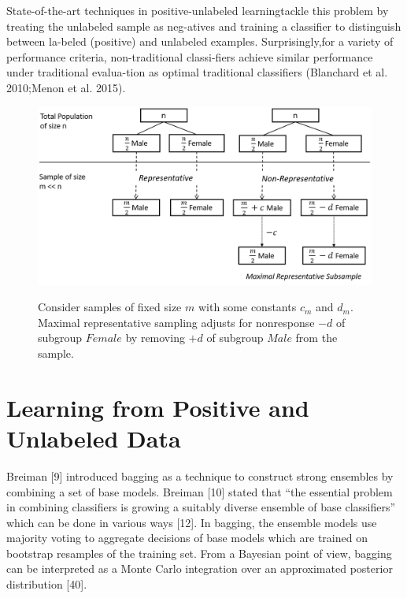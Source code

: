 State-of-the-art techniques in positive-unlabeled learningtackle this problem by treating the unlabeled sample as neg-atives and training a classiﬁer to distinguish between la-beled (positive) and unlabeled examples. 
Surprisingly,for a variety of performance criteria, non-traditional classi-ﬁers achieve similar performance under traditional evalua-tion as optimal traditional classiﬁers (Blanchard et al. 2010;Menon et al. 2015). 

\begin{figure}[ht]
	\begin{center}
		\includegraphics[scale=0.54,angle=0]{fig/Representative}
		\label{representativ}
		\caption{Consider samples of fixed size \(m\) with some constants \(c_m\) and \(d_m\). Maximal representative sampling adjusts for nonresponse \(-d\) of subgroup \(Female\) by removing \(+d\) of subgroup \(Male\) from the sample.}
	\end{center}
\end{figure}

\section{Learning from Positive and Unlabeled Data}

Breiman [9] introduced bagging as a technique to construct strong ensembles by combining a set of base models. Breiman [10] stated that “the essential problem in combining classiﬁers is growing a suitably diverse ensemble of base classiﬁers” which can be done in various ways [12]. In bagging, the ensemble models use majority voting to aggregate decisions of base models which are trained on bootstrap resamples of the training set. From a Bayesian point of view, bagging can be interpreted as a Monte Carlo integration over an approximated posterior distribution [40]. 

